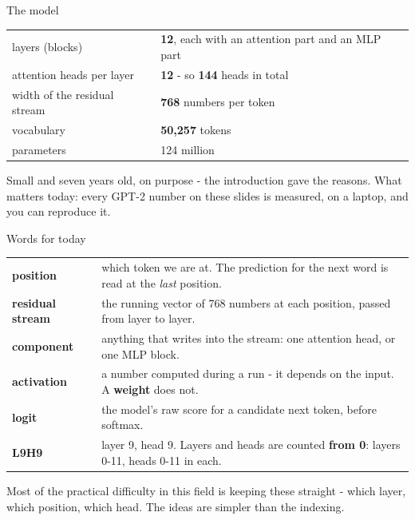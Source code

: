 \documentclass[aspectratio=169]{beamer}
\newcommand{\watchbox}[1]{%
  \begin{tcolorbox}[colback=armorange!12, colframe=armorange, boxrule=0.6pt, arc=2pt]
  #1
  \end{tcolorbox}}
\begin{document}
\begin{frame}{The model}
  \vspace{0.6em}
  \begin{center}
  \begin{tabular}{@{}ll@{}}
    \toprule
    layers (blocks) & \textbf{12}, each with an attention part and an MLP part\\
    attention heads per layer & \textbf{12} - so \textbf{144} heads in total\\
    width of the residual stream & \textbf{768} numbers per token\\
    vocabulary & \textbf{50{,}257} tokens\\
    parameters & 124 million\\
    \bottomrule
  \end{tabular}
  \end{center}

  \vspace{0.8em}
  Small and seven years old, on purpose - the introduction gave the reasons. What matters today:
  every GPT-2 number on these slides is measured, on a laptop, and you can reproduce it.
\end{frame}

\begin{frame}{Words for today}
  \vspace{0.3em}
  \begin{center}
  \small
  \begin{tabular}{@{}p{}p{}@{}}
    \toprule
    \textbf{position} & which token we are at. The prediction for the next word is read at the
      \emph{last} position.\\[0.2em]
    \textbf{residual stream} & the running vector of 768 numbers at each position, passed from
      layer to layer.\\[0.2em]
    \textbf{component} & anything that writes into the stream: one attention head, or one MLP
      block.\\[0.2em]
    \textbf{activation} & a number computed during a run - it depends on the input. A
      \textbf{weight} does not.\\[0.2em]
    \textbf{logit} & the model's raw score for a candidate next token, before softmax.\\[0.2em]
    \textbf{L9H9} & layer 9, head 9. Layers and heads are counted \textbf{from 0}: layers 0-11,
      heads 0-11 in each.\\
    \bottomrule
  \end{tabular}
  \end{center}

  \vspace{0.4em}
  \watchbox{\small Most of the practical difficulty in this field is keeping these straight -
  which layer, which position, which head. The ideas are simpler than the indexing.}
\end{frame}
\end{document}
